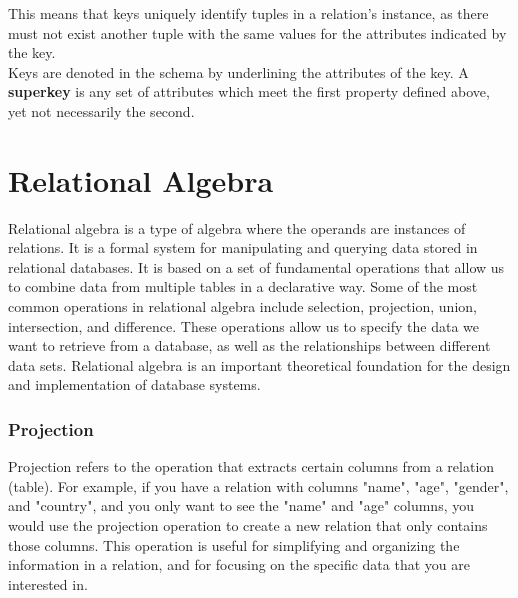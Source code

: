 \documentclass{report}
\begin{document}
     \par This means that keys uniquely identify tuples in a relation's instance, as there must not exist another tuple with the same values for the attributes indicated by the key.\\

     Keys are denoted in the schema by underlining the attributes of the key. A \textbf{superkey} is any set of attributes which meet the first property defined above, yet not necessarily the second.



    \section{Relational Algebra}
        Relational algebra is a type of algebra where the operands are instances of relations. It is a formal system for manipulating and querying data stored in relational databases. It is based on a set of fundamental operations that allow us to combine data from multiple tables in a declarative way. Some of the most common operations in relational algebra include selection, projection, union, intersection, and difference. These operations allow us to specify the data we want to retrieve from a database, as well as the relationships between different data sets. Relational algebra is an important theoretical foundation for the design and implementation of database systems.

        \subsubsection{Projection}
        Projection refers to the operation that extracts certain columns from a relation (table). For example, if you have a relation with columns "name", "age", "gender", and "country", and you only want to see the "name" and "age" columns, you would use the projection operation to create a new relation that only contains those columns. This operation is useful for simplifying and organizing the information in a relation, and for focusing on the specific data that you are interested in. \\

\end{document}
